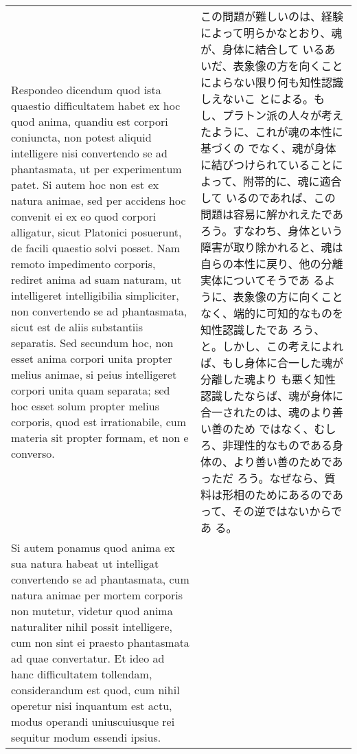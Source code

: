 \documentclass[10pt]{jsarticle} %
\begin{document}
\begin{longtable}{p{21em}p{21em}}
{\sc Respondeo dicendum quod} ista quaestio
 difficultatem habet ex hoc quod anima, quandiu est corpori coniuncta,
 non potest aliquid intelligere nisi convertendo se ad phantasmata, ut
 per experimentum patet. Si autem hoc non est ex natura animae, sed per
 accidens hoc convenit ei ex eo quod corpori alligatur,
sicut Platonici
 posuerunt, de facili quaestio solvi posset. Nam remoto impedimento
 corporis, rediret anima ad suam naturam, ut intelligeret intelligibilia
 simpliciter, non convertendo se ad phantasmata, sicut est de aliis
 substantiis separatis. Sed secundum hoc, non esset anima corpori unita
 propter melius animae, si peius intelligeret corpori unita quam
 separata; sed hoc esset solum propter melius corporis, quod est
 irrationabile, cum materia sit propter formam, et non e converso. 

& この問題が難しいのは、経験によって明らかなとおり、魂が、身体に結合して
いるあいだ、表象像の方を向くことによらない限り何も知性認識しえないこ
とによる。もし、プラトン派の人々が考えたように、これが魂の本性に基づくの
でなく、魂が身体に結びつけられていることによって、附帯的に、魂に適合して
いるのであれば、この問題は容易に解かれえたであろう。すなわち、身体という
障害が取り除かれると、魂は自らの本性に戻り、他の分離実体についてそうであ
るように、表象像の方に向くことなく、端的に可知的なものを知性認識したであ
ろう、と。しかし、この考えによれば、もし身体に合一した魂が分離した魂より
も悪く知性認識したならば、魂が身体に合一されたのは、魂のより善い善のため
ではなく、むしろ、非理性的なものである身体の、より善い善のためであっただ
ろう。なぜなら、質料は形相のためにあるのであって、その逆ではないからであ
る。

\\

Si autem ponamus quod anima ex sua natura habeat ut intelligat convertendo
 se ad phantasmata, cum natura animae per mortem corporis non mutetur,
 videtur quod anima naturaliter nihil possit intelligere, cum non sint
 ei praesto
 phantasmata ad quae convertatur. Et ideo ad hanc
 difficultatem tollendam, considerandum est quod, cum nihil operetur
 nisi inquantum est actu, modus operandi uniuscuiusque rei sequitur
 modum essendi ipsius.


\end{longtable}
\end{document}
